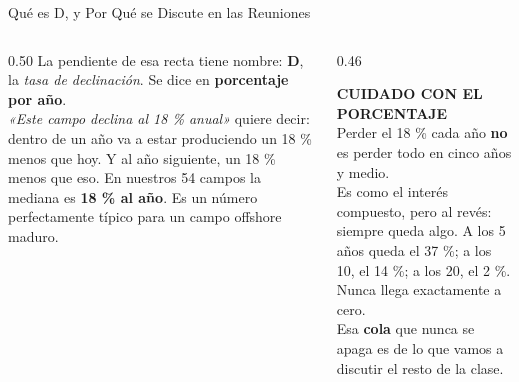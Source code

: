 \documentclass[aspectratio=169, 11pt]{beamer}
\begin{document}
\begin{frame}[shrink=8]{Qué es D, y Por Qué se Discute en las Reuniones}
  \vspace{-4pt}
  \begin{columns}[T]
    \begin{column}{0.50\textwidth}
      {\footnotesize\color{textMuted}
      La pendiente de esa recta tiene nombre: \textbf{D}, la \emph{tasa de
      declinación}. Se dice en \textbf{porcentaje por año}.\\[6pt]
      \textit{«Este campo declina al 18 \% anual»} quiere decir: dentro de un
      año va a estar produciendo un 18 \% menos que hoy. Y al año siguiente,
      un 18 \% menos que eso.}
      \vspace{6pt}
      {\footnotesize\color{arcaDark}
       En nuestros 54 campos la mediana es \textbf{18 \% al año}. Es
       un número perfectamente típico para un campo offshore maduro.}
    \end{column}
    \begin{column}{0.46\textwidth}
      \begin{tcolorbox}[colback=arcaGray, colframe=arcaRed, boxrule=0pt, leftrule=3pt,
        arc=3pt, left=6pt, right=6pt, top=5pt, bottom=5pt]
        {\scriptsize\color{arcaRed}\bfseries\faExclamationTriangle\hspace{4pt}CUIDADO CON EL PORCENTAJE}\\[4pt]
        {\scriptsize\color{textMuted}
         Perder el 18 \% cada año \textbf{no} es perder todo en cinco años y
         medio.\\[4pt]
         Es como el interés compuesto, pero al revés: siempre queda algo.
         A los 5 años queda el 37 \%; a los 10, el 14 \%; a los 20,
         el 2 \%. Nunca llega exactamente a cero.\\[4pt]
         Esa \textbf{cola} que nunca se apaga es de lo que vamos a discutir
         el resto de la clase.}
      \end{tcolorbox}
    \end{column}
  \end{columns}
\end{frame}
\end{document}
